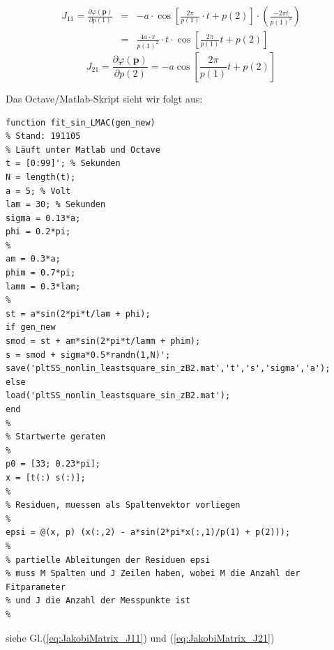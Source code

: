 \begin{eqnarray}
 \nonumber J_{11} = \frac{\partial\varphi(\boldsymbol{p})}{\partial p(1)} &=&
	- a\cdot \cos \left[ \frac{2\pi}{p(1)} \cdot t +p(2) \right] \cdot
	\left(\frac{-2\pi t}{p(1)^2} \right) \\
	&=& \frac{4a\cdot \pi}{p(1)^2}\cdot t \cdot \cos \left[\frac{2 \pi}{p(1)} t +p(2) \right]
	\label{eq:JakobiMatrix_J11}
\end{eqnarray}
\begin{equation}
	J_{21} = \frac{\partial\varphi(\boldsymbol{p})}{\partial p(2)} = - a \cos \left[
	\frac{2 \pi}{p(1)} t + p(2) \right]
		\label{eq:JakobiMatrix_J21}
\end{equation}

 Das Octave/Matlab-Skript sieht wir folgt aus:

\begin{verbatim}
function fit_sin_LMAC(gen_new)
% Stand: 191105
% Läuft unter Matlab und Octave
t = [0:99]'; % Sekunden
N = length(t);
a = 5; % Volt
lam = 30; % Sekunden
sigma = 0.13*a;
phi = 0.2*pi;
%
am = 0.3*a;
phim = 0.7*pi;
lamm = 0.3*lam;
%
st = a*sin(2*pi*t/lam + phi);
if gen_new
smod = st + am*sin(2*pi*t/lamm + phim);
s = smod + sigma*0.5*randn(1,N)';
save('pltSS_nonlin_leastsquare_sin_zB2.mat','t','s','sigma','a');
else
load('pltSS_nonlin_leastsquare_sin_zB2.mat');
end
%
% Startwerte geraten
%
p0 = [33; 0.23*pi];
x = [t(:) s(:)];
%
% Residuen, muessen als Spaltenvektor vorliegen
%
epsi = @(x, p) (x(:,2) - a*sin(2*pi*x(:,1)/p(1) + p(2)));
%
% partielle Ableitungen der Residuen epsi
% muss M Spalten und J Zeilen haben, wobei M die Anzahl der Fitparameter
% und J die Anzahl der Messpunkte ist
%
\end{verbatim}
siehe Gl.(\ref{eq:JakobiMatrix_J11}) und (\ref{eq:JakobiMatrix_J21})
